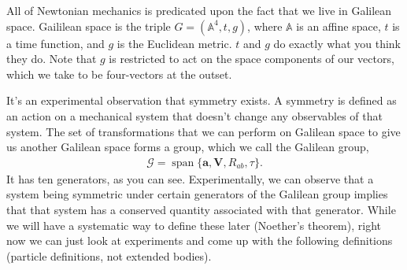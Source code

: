 \documentclass[11pt]{article}
\begin{document}




All of Newtonian mechanics is predicated upon the fact that we live
in Galilean space. Gaililean space is the triple $G = (\mathbb{A}^4, t, g)$,
where $\mathbb{A}$ is an affine space, $t$ is a time function, and $g$
is the Euclidean metric. $t$ and $g$ do exactly what you think they do.
Note that $g$ is restricted to act on the space components of our vectors,
which we take to be four-vectors at the outset.

It's an experimental observation that symmetry exists. A symmetry
is defined as an action on a mechanical system that doesn't change
any observables of that system. The set of transformations that
we can perform on Galilean space to give us another Galilean space
forms a group, which we call the Galilean group,
\begin{align*}
    \mathcal{G} = \operatorname{span}\{ \mathbf{a}, \mathbf{V}, R_{ab}, \tau \}.
\end{align*}
It has ten generators, as you can see. Experimentally, we can observe
that a system being symmetric under certain generators of the Galilean
group implies that that system has a conserved quantity associated with
that generator. While we will have a systematic way to define these later
(Noether's theorem), right now we can just look at experiments and come up
with the following definitions (particle definitions, not extended bodies).
\end{document}
